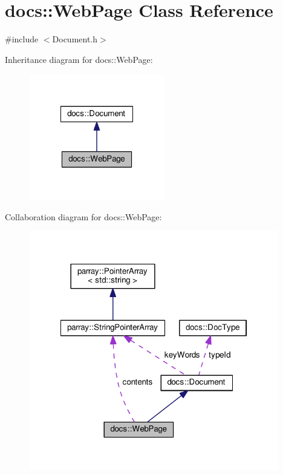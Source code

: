 \hypertarget{classdocs_1_1WebPage}{\section{docs\-:\-:Web\-Page Class Reference}
\label{classdocs_1_1WebPage}
}


{\ttfamily \#include $<$Document.\-h$>$}



Inheritance diagram for docs\-:\-:Web\-Page\-:\nopagebreak
\begin{figure}[H]
\begin{center}
\leavevmode
\includegraphics[width=168pt]{classdocs_1_1WebPage__inherit__graph}
\end{center}
\end{figure}


Collaboration diagram for docs\-:\-:Web\-Page\-:\nopagebreak
\begin{figure}[H]
\begin{center}
\leavevmode
\includegraphics[width=309pt]{classdocs_1_1WebPage__coll__graph}
\end{center}
\end{figure}
